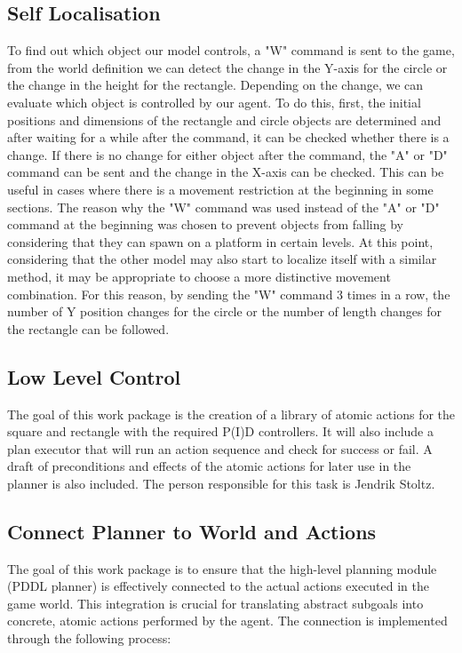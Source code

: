 \documentclass{article}
\begin{document}
\subsection{Self Localisation}
To find out which object our model controls, a "W" command is sent to the game, from the world definition we can detect the change in the Y-axis for the circle or the change in the height for the rectangle. Depending on the change, we can evaluate which object is controlled by our agent. To do this, first, the initial positions and dimensions of the rectangle and circle objects are determined and after waiting for a while after the command, it can be checked whether there is a change. If there is no change for either object after the command, the "A" or "D" command can be sent and the change in the X-axis can be checked. This can be useful in cases where there is a movement restriction at the beginning in some sections. The reason why the "W" command was used instead of the "A" or "D" command at the beginning was chosen to prevent objects from falling by considering that they can spawn on a platform in certain levels. At this point, considering that the other model may also start to localize itself with a similar method, it may be appropriate to choose a more distinctive movement combination. For this reason, by sending the "W" command 3 times in a row, the number of Y position changes for the circle or the number of length changes for the rectangle can be followed.

\subsection{Low Level Control}
The goal of this work package is the creation of a library of atomic actions for the square and rectangle with the required P(I)D controllers. It will also include a plan executor that will run an action sequence and check for success or fail.
A draft of preconditions and effects of the atomic actions for later use in the planner is also included. The person responsible for this task is Jendrik Stoltz.

\subsection{Connect Planner to World and Actions}

The goal of this work package is to ensure that the high-level planning module (PDDL planner) is effectively connected to the actual actions executed in the game world. This integration is crucial for translating abstract subgoals into concrete, atomic actions performed by the agent. The connection is implemented through the following process:
\end{document}
